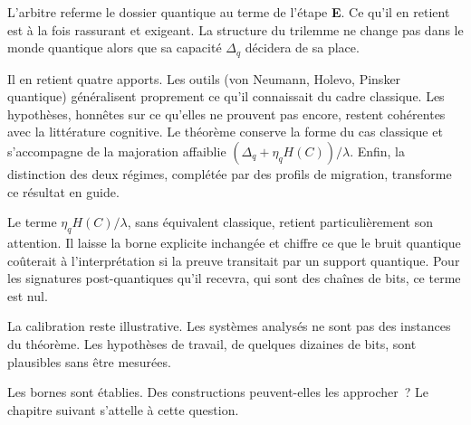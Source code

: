 \begin{boiteArbitre}
L'arbitre referme le dossier quantique au terme de l'\'etape \textbf{E}.
Ce qu'il en retient est \`a la fois rassurant et exigeant. La structure
du trilemme ne change pas dans le monde quantique alors que sa capacit\'e
$\Delta_q$ d\'ecidera de sa place.

Il en retient quatre apports. Les outils (von Neumann, Holevo, Pinsker
quantique) g\'en\'eralisent proprement ce qu'il connaissait du cadre classique.
Les hypoth\`eses, honn\^etes sur ce qu'elles ne prouvent pas encore, restent
coh\'erentes avec la litt\'erature cognitive. Le th\'eor\`eme conserve la forme
du cas classique et s'accompagne de la majoration affaiblie
$(\Delta_q + \eta_q H(C))/\lambda$. Enfin, la distinction des deux r\'egimes,
compl\'et\'ee par des profils de migration, transforme ce r\'esultat en
guide.

Le terme $\eta_q H(C)/\lambda$, sans \'equivalent classique, retient
particuli\`erement son attention. Il laisse la borne explicite inchang\'ee et
chiffre ce que le bruit quantique co\^uterait \`a l'interpr\'etation si la
preuve transitait par un support quantique. Pour les signatures
post-quantiques qu'il recevra, qui sont des cha\^ines de bits, ce terme est nul.

La calibration reste illustrative. Les syst\`emes analys\'es ne sont pas
des instances du th\'eor\`eme. Les hypoth\`eses de travail, de quelques
dizaines de bits, sont plausibles sans \^etre mesur\'ees.

Les bornes sont \'etablies. Des constructions peuvent-elles les
approcher~? Le chapitre suivant s'attelle \`a cette question.
\end{boiteArbitre}